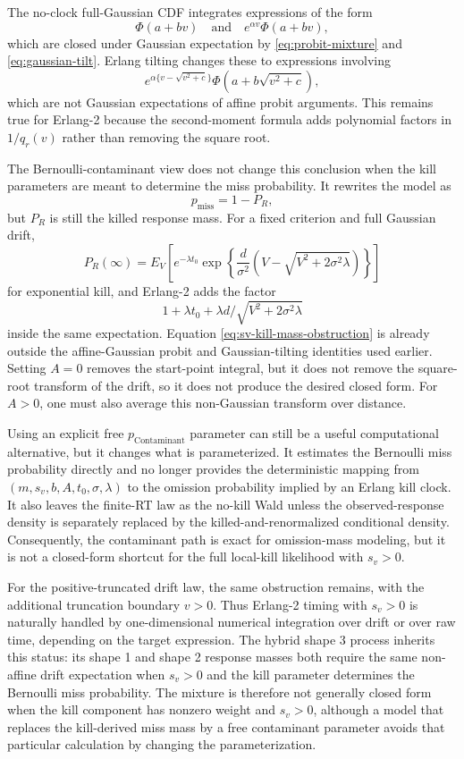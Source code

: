 \documentclass[12pt]{article}
\newcommand{\PhiN}{\Phi}
\begin{document}
The no-clock full-Gaussian CDF integrates expressions of the form
\[
  \PhiN(a+bv)
  \quad\text{and}\quad
  e^{\alpha v}\PhiN(a+bv),
\]
which are closed under Gaussian expectation by \eqref{eq:probit-mixture} and \eqref{eq:gaussian-tilt}. Erlang tilting changes these to expressions involving
\[
  e^{\alpha\{v-\sqrt{v^2+c}\}}\PhiN(a+b\sqrt{v^2+c}),
\]
which are not Gaussian expectations of affine probit arguments. This remains true for Erlang-2 because the second-moment formula adds polynomial factors in $1/q_r(v)$ rather than removing the square root.

The Bernoulli-contaminant view does not change this conclusion when the kill parameters are meant to determine the miss probability. It rewrites the model as
\[
  p_{\mathrm{miss}}=1-P_R,
\]
but $P_R$ is still the killed response mass. For a fixed criterion and full Gaussian drift,
\begin{equation}
  P_R(\infty)
  =
  E_V\left[
    e^{-\lambda t_0}
    \exp\!\left\{\frac{d}{\sigma^2}
      \left(V-\sqrt{V^2+2\sigma^2\lambda}\right)\right\}
  \right]
  \label{eq:sv-kill-mass-obstruction}
\end{equation}
for exponential kill, and Erlang-2 adds the factor
\[
  1+\lambda t_0+\lambda d/\sqrt{V^2+2\sigma^2\lambda}
\]
inside the same expectation. Equation
\eqref{eq:sv-kill-mass-obstruction} is already outside the affine-Gaussian
probit and Gaussian-tilting identities used earlier. Setting $A=0$ removes the start-point integral, but it does not remove the square-root transform of the drift, so it does not produce the desired closed form. For $A>0$, one must also average this non-Gaussian transform over distance.

Using an explicit free $p_{\mathrm{Contaminant}}$ parameter can still be a useful computational alternative, but it changes what is parameterized. It estimates the Bernoulli miss probability directly and no longer provides the deterministic mapping from $(m,s_v,b,A,t_0,\sigma,\lambda)$ to the omission probability implied by an Erlang kill clock. It also leaves the finite-RT law as the no-kill Wald unless the observed-response density is separately replaced by the killed-and-renormalized conditional density. Consequently, the contaminant path is exact for omission-mass modeling, but it is not a closed-form shortcut for the full local-kill likelihood with $s_v>0$.

For the positive-truncated drift law, the same obstruction remains, with the additional truncation boundary $v>0$. Thus Erlang-2 timing with $s_v>0$ is naturally handled by one-dimensional numerical integration over drift or over raw time, depending on the target expression. The hybrid shape 3 process inherits this status: its shape 1 and shape 2 response masses both require the same non-affine drift expectation when $s_v>0$ and the kill parameter determines the Bernoulli miss probability. The mixture is therefore not generally closed form when the kill component has nonzero weight and $s_v>0$, although a model that replaces the kill-derived miss mass by a free contaminant parameter avoids that particular calculation by changing the parameterization.
\end{document}
